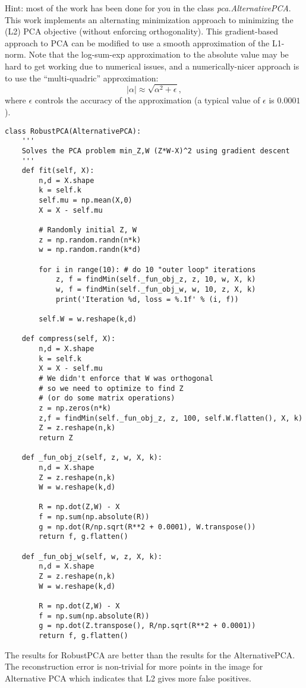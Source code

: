 \documentclass{article}
\def\red#1{{\color{red}#1}}
\begin{document}
Hint: most of the work has been done for you in the class \emph{pca.AlternativePCA}.
This work implements an alternating minimization approach to minimizing the (L2) PCA objective (without enforcing orthogonality). This gradient-based approach to PCA can be modified to use a smooth approximation of the L1-norm. Note that the log-sum-exp approximation to the absolute value may be hard to get working due to numerical issues, and a numerically-nicer approach is to use the ``multi-quadric'' approximation:
\[
|\alpha| \approx \sqrt{\alpha^2 + \epsilon},
\]
where $\epsilon$ controls the accuracy of the approximation (a typical value of $\epsilon$ is $0.0001$).
 \begin{lstlisting}
class RobustPCA(AlternativePCA):
    '''
    Solves the PCA problem min_Z,W (Z*W-X)^2 using gradient descent
    '''
    def fit(self, X):
        n,d = X.shape
        k = self.k
        self.mu = np.mean(X,0)
        X = X - self.mu

        # Randomly initial Z, W
        z = np.random.randn(n*k)
        w = np.random.randn(k*d)

        for i in range(10): # do 10 "outer loop" iterations
            z, f = findMin(self._fun_obj_z, z, 10, w, X, k)
            w, f = findMin(self._fun_obj_w, w, 10, z, X, k)
            print('Iteration %d, loss = %.1f' % (i, f))

        self.W = w.reshape(k,d)

    def compress(self, X):
        n,d = X.shape
        k = self.k
        X = X - self.mu
        # We didn't enforce that W was orthogonal 
        # so we need to optimize to find Z
        # (or do some matrix operations)
        z = np.zeros(n*k)
        z,f = findMin(self._fun_obj_z, z, 100, self.W.flatten(), X, k)
        Z = z.reshape(n,k)
        return Z

    def _fun_obj_z(self, z, w, X, k):
        n,d = X.shape
        Z = z.reshape(n,k)
        W = w.reshape(k,d)

        R = np.dot(Z,W) - X
        f = np.sum(np.absolute(R))
        g = np.dot(R/np.sqrt(R**2 + 0.0001), W.transpose())
        return f, g.flatten()

    def _fun_obj_w(self, w, z, X, k):
        n,d = X.shape
        Z = z.reshape(n,k)
        W = w.reshape(k,d)

        R = np.dot(Z,W) - X
        f = np.sum(np.absolute(R))
        g = np.dot(Z.transpose(), R/np.sqrt(R**2 + 0.0001))
        return f, g.flatten()
 \end{lstlisting}
\red{The results for RobustPCA are better than the results for the AlternativePCA. The reconstruction error is non-trivial for more points in the image for Alternative PCA which indicates that L2 gives more false positives.}
\end{document}
